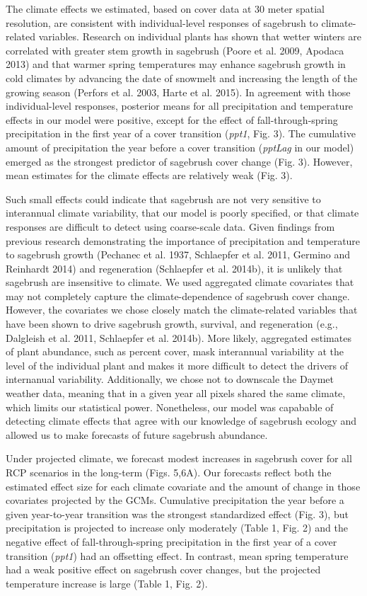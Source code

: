 \documentclass[12pt,]{article}
\begin{document}
The climate effects we estimated, based on cover data at 30 meter
spatial resolution, are consistent with individual-level responses of
sagebrush to climate-related variables. Research on individual plants
has shown that wetter winters are correlated with greater stem growth in
sagebrush (Poore et al. 2009, Apodaca 2013) and that warmer spring
temperatures may enhance sagebrush growth in cold climates by advancing
the date of snowmelt and increasing the length of the growing season
(Perfors et al. 2003, Harte et al. 2015). In agreement with those
individual-level responses, posterior means for all precipitation and
temperature effects in our model were positive, except for the effect of
fall-through-spring precipitation in the first year of a cover
transition (\emph{ppt1}, Fig. 3). The cumulative amount of precipitation
the year before a cover transition (\emph{pptLag} in our model) emerged
as the strongest predictor of sagebrush cover change (Fig. 3). However,
mean estimates for the climate effects are relatively weak (Fig. 3).

Such small effects could indicate that sagebrush are not very sensitive
to interannual climate variability, that our model is poorly specified,
or that climate responses are difficult to detect using coarse-scale
data. Given findings from previous research demonstrating the importance
of precipitation and temperature to sagebrush growth (Pechanec et al.
1937, Schlaepfer et al. 2011, Germino and Reinhardt 2014) and
regeneration (Schlaepfer et al. 2014b), it is unlikely that sagebrush
are insensitive to climate. We used aggregated climate covariates that
may not completely capture the climate-dependence of sagebrush cover
change. However, the covariates we chose closely match the
climate-related variables that have been shown to drive sagebrush
growth, survival, and regeneration (e.g., Dalgleish et al. 2011,
Schlaepfer et al. 2014b). More likely, aggregated estimates of plant
abundance, such as percent cover, mask interannual variability at the
level of the individual plant and makes it more difficult to detect the
drivers of internanual variability. Additionally, we chose not to
downscale the Daymet weather data, meaning that in a given year all
pixels shared the same climate, which limits our statistical power.
Nonetheless, our model was capabable of detecting climate effects that
agree with our knowledge of sagebrush ecology and allowed us to make
forecasts of future sagebrush abundance.

Under projected climate, we forecast modest increases in sagebrush cover
for all RCP scenarios in the long-term (Figs. 5,6A). Our forecasts
reflect both the estimated effect size for each climate covariate and
the amount of change in those covariates projected by the GCMs.
Cumulative precipitation the year before a given year-to-year transition
was the strongest standardized effect (Fig. 3), but precipitation is
projected to increase only moderately (Table 1, Fig. 2) and the negative
effect of fall-through-spring precipitation in the first year of a cover
transition (\emph{ppt1}) had an offsetting effect. In contrast, mean
spring temperature had a weak positive effect on sagebrush cover
changes, but the projected temperature increase is large (Table 1, Fig.
2).
\end{document}
